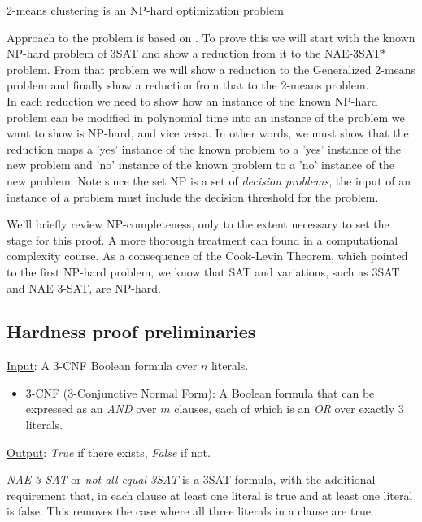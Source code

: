 \begin{theorem}\label{2-means-np-hard}
2-means clustering is an NP-hard optimization problem
\end{theorem} 

Approach to the problem is based on \cite{das2008}.  To prove this we
will start with the known NP-hard problem of 3SAT and show a reduction
from it to the NAE-3SAT* problem.  From that problem we will show a
reduction to the Generalized 2-means problem and finally show a
reduction from that to the 2-means problem. \\

In each reduction  we need to show how an instance of the known NP-hard problem can be modified in polynomial time into an instance of the problem we want
to show is NP-hard, and vice versa. In other words, we must show that the reduction maps a 'yes'
instance of the known problem to a 'yes' instance of the new problem
and 'no' instance of the known problem to a 'no' instance of the new
problem. Note since the set NP is a set of \emph{decision problems}, the
input of an instance of a problem must include the decision threshold
for the problem.

We'll briefly review NP-completeness, only to the extent necessary to
set the stage for this proof.  A more thorough treatment can found in
a computational complexity course. As a consequence of the Cook-Levin
Theorem, which pointed to the first NP-hard problem, we know that SAT
and variations, such as 3SAT and NAE 3-SAT, are NP-hard.

\subsection{Hardness proof preliminaries}
\begin{definition}[3SAT]
\item \underline{Input}:  A 3-CNF Boolean formula over $n$ literals. 
\begin{itemize}
\item 3-CNF (3-Conjunctive Normal Form): A Boolean formula that can be expressed as an \emph{AND} over
  $m$ clauses, each of which is an \emph{OR} over exactly 3 literals.
\end{itemize}
\item \underline{Output}: \emph{True} if there exists, \emph{False} if not.
\end{definition}

\begin{definition} \emph{NAE 3-SAT} or
  \emph{not-all-equal-3SAT} is a 3SAT formula, with the additional
  requirement that, in each clause at least one literal is true and at
  least one literal is false.  This removes the case where all three
  literals in a clause are true.   
\end{definition}


